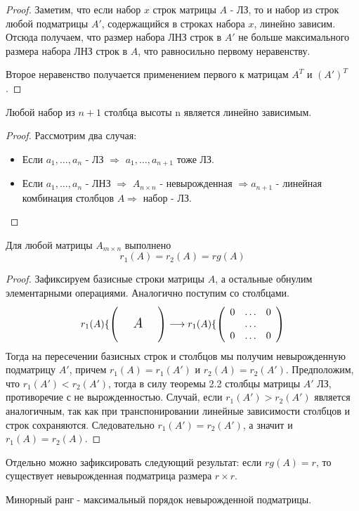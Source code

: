 \begin{proof}
    Заметим, что если набор $x$ строк матрицы $A$ - ЛЗ, то и набор из строк любой подматрицы $A'$, содержащийся в строках набора $x$, линейно зависим. Отсюда получаем, что размер набора ЛНЗ строк в $A'$ не больше максимального размера набора ЛНЗ строк в $A$, что равносильно первому неравенству.
    
    Второе неравенство получается применением первого к матрицам $A^T$ и $(A')^T$.
\end{proof}
\begin{theorem}
    Любой набор из $n+1$ столбца высоты n является линейно зависимым.
\end{theorem}
\begin{proof}
    Рассмотрим два случая:
    \begin{itemize}
        \item Если $a_1, \dots, a_n$ - ЛЗ $\Rightarrow$ $a_1, \dots, a_{n+1}$ тоже ЛЗ.
        \item Если $a_1, \dots, a_n$ - ЛНЗ $\Rightarrow$ $A_{n \times n}$ - невырожденная $\Rightarrow a_{n+1}$ - линейная комбинация столбцов $A \Rightarrow$ набор - ЛЗ.  
    \end{itemize}
\end{proof}
\begin{theorem} 
\label{Теорема о ранге матрицы.}
    Для любой матрицы $A_{m \times n}$ выполнено $$r_1 (A) = r_2 (A) = rg(A)$$
\end{theorem}
\begin{proof}
Зафиксируем базисные строки матрицы $A$, а остальные обнулим элементарными операциями. Аналогично поступим со столбцами.
\[
    r_1(A)\{
    \left( 
        \begin{array}{ccc}
         &  &  \\
         & \text{\Large \textit{A}} &  \\
         &  & 
        \end{array}
    \right)
    \longrightarrow
    r_1(A)\{
    \left( 
        \begin{array}{ccc}
         0 & \dots & 0 \\
         & \dots &  \\
         0 & \dots & 0
        \end{array}
    \right)
\]
Тогда на пересечении базисных строк и столбцов мы получим невырожденную подматрицу $A'$, причем $r_1(A) = r_1(A')$ и $r_2(A) = r_2(A')$. Предположим, что $r_1(A') < r_2(A')$, тогда в силу теоремы 2.2 столбцы матрицы $A'$ ЛЗ, противоречие с не вырожденностью. Случай, если $r_1(A') > r_2(A')$ является аналогичным, так как при транспонировании линейные зависимости столбцов и строк сохраняются. Следовательно $r_1(A') = r_2(A')$, а значит и $r_1(A) = r_2(A)$.
\end{proof}
\begin{note}
    Отдельно можно зафиксировать следующий результат: если $rg(A) = r$, то существует невырожденная подматрица размера  $r \times r$.
\end{note}
\begin{definition}
    Минорный ранг - максимальный порядок невырожденной подматрицы.
\end{definition}